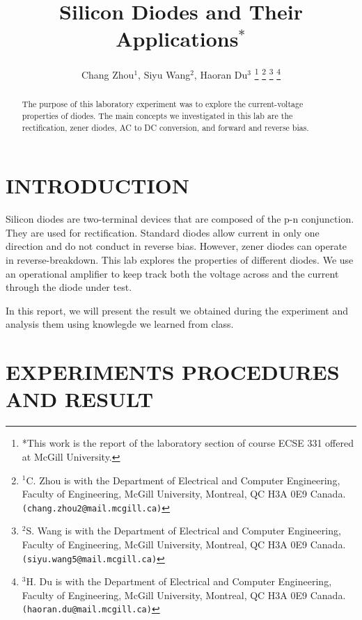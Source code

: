 \documentclass[letterpaper, 10 pt, conference]{ieeeconf}  %
\title{\LARGE \bf Silicon Diodes and Their Applications$^{*}$}
\author{Chang Zhou$^{1}$, Siyu Wang$^{2}$, Haoran Du$^{3}$%
\thanks{*This work is the report of the laboratory section of course ECSE 331 offered at McGill University.}%
\thanks{$^{1}$C. Zhou is with the Department of Electrical and Computer
Engineering, Faculty of Engineering, McGill University, Montreal, QC H3A 0E9 Canada.
{\tt\small (chang.zhou2@mail.mcgill.ca)}}%
\thanks{$^{2}$S. Wang is with the Department of Electrical and Computer
Engineering, Faculty of Engineering, McGill University, Montreal, QC H3A 0E9 Canada.
{\tt\small (siyu.wang5@mail.mcgill.ca)}}%
\thanks{$^{3}$H. Du is with the Department of Electrical and Computer
Engineering, Faculty of Engineering, McGill University, Montreal, QC H3A 0E9 Canada.
{\tt\small (haoran.du@mail.mcgill.ca)}}%
}
\begin{document}
    \maketitle
    \thispagestyle{empty}
    \pagestyle{empty}


    \begin{abstract}
        The purpose of this laboratory experiment was to explore the current-voltage properties of diodes. The main concepts we investigated in this lab are the rectification, zener diodes, AC to DC conversion, and forward and reverse bias.
    \end{abstract}


    \section{INTRODUCTION}
    Silicon diodes are two-terminal devices that are composed of the p-n conjunction. They are used for rectification. Standard diodes allow current in only one direction and do not conduct in reverse bias. However, zener diodes can operate in reverse-breakdown. This lab explores the properties of different diodes. We use an operational amplifier to keep track both the voltage across and the current through the diode under test.
\par In this report, we will present the result we obtained during the experiment and analysis them using knowlegde we learned from class.
    \section{EXPERIMENTS PROCEDURES AND RESULT}
\end{document}
